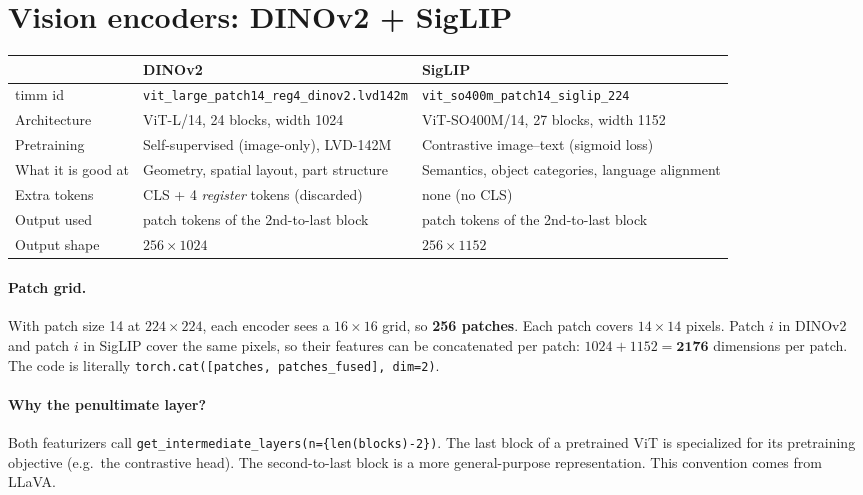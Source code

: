 \documentclass[11pt]{article}
\begin{document}
\section{Vision encoders: DINOv2 + SigLIP}

\begin{center}
{\small\begin{tabularx}{\linewidth}{@{}lXX@{}}
\toprule
 & DINOv2 & SigLIP \\
\midrule
timm id & \texttt{\footnotesize vit\_large\_patch14\_reg4\_dinov2\allowbreak.lvd142m} & \texttt{\footnotesize vit\_so400m\_patch14\_siglip\_224} \\
Architecture & ViT-L/14, 24 blocks, width 1024 & ViT-SO400M/14, 27 blocks, width 1152 \\
Pretraining & Self-supervised (image-only), LVD-142M & Contrastive image--text (sigmoid loss) \\
What it is good at & Geometry, spatial layout, part structure & Semantics, object categories, language alignment \\
Extra tokens & CLS + 4 \emph{register} tokens (discarded) & none (no CLS) \\
Output used & patch tokens of the 2nd-to-last block & patch tokens of the 2nd-to-last block \\
Output shape & $256\times1024$ & $256\times1152$ \\
\bottomrule
\end{tabularx}}
\end{center}

\paragraph{Patch grid.} With patch size 14 at $224\times224$, each encoder sees a $16\times16$ grid, so \textbf{256 patches}. Each patch covers $14\times14$ pixels. Patch $i$ in DINOv2 and patch $i$ in SigLIP cover the same pixels, so their features can be concatenated per patch: $1024+1152=\mathbf{2176}$ dimensions per patch. The code is literally \texttt{torch.cat([patches, patches\_fused], dim=2)}.

\paragraph{Why the penultimate layer?} Both featurizers call \texttt{get\_intermediate\_layers(n=\{len(blocks)-2\})}. The last block of a pretrained ViT is specialized for its pretraining objective (e.g.\ the contrastive head). The second-to-last block is a more general-purpose representation. This convention comes from LLaVA.
\end{document}
